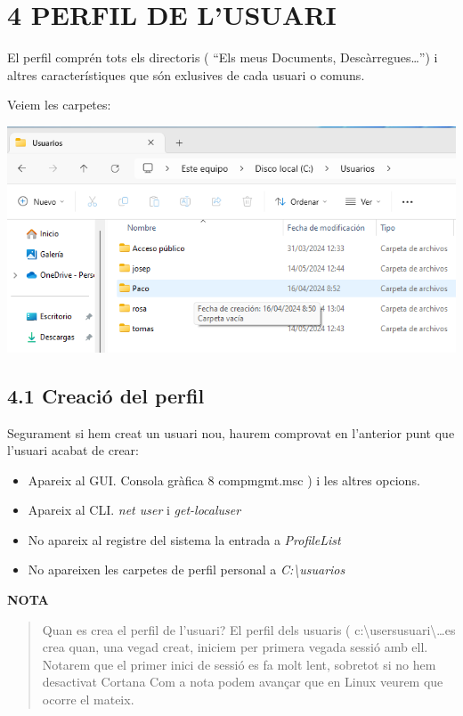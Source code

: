 \documentclass[
  a4paper,
]{article}
\providecommand{\tightlist}{%
  \setlength{\itemsep}{0pt}\setlength{\parskip}{0pt}}
\begin{document}
\section{4 PERFIL DE L'USUARI}\label{perfil-de-lusuari}

El perfil comprén tots els directoris ( ``Els meus Documents,
Descàrregues\ldots{}'') i altres característiques que són exlusives de
cada usuari o comuns.

Veiem les carpetes:

\includegraphics{png/users.png}

\subsection{4.1 Creació del perfil}\label{creaciuxf3-del-perfil}

Segurament si hem creat un usuari nou, haurem comprovat en l'anterior
punt que l'usuari acabat de crear:

\begin{itemize}
\tightlist
\item
  Apareix al GUI. Consola gràfica 8 compmgmt.msc ) i les altres opcions.
\item
  Apareix al CLI. \emph{net user} i \emph{get-localuser}
\item
  No apareix al registre del sistema la entrada a \emph{ProfileList}
\item
  No apareixen les carpetes de perfil personal a
  \emph{C:\textbackslash usuarios}
\end{itemize}

\textbf{NOTA}

\begin{quote}
Quan es crea el perfil de l'usuari? El perfil dels usuaris (
c:\textbackslash users\textbar usuari\textbackslash\ldots es crea quan,
una vegad creat, iniciem per primera vegada sessió amb ell. Notarem que
el primer inici de sessió es fa molt lent, sobretot si no hem desactivat
Cortana Com a nota podem avançar que en Linux veurem que ocorre el
mateix.
\end{quote}
\end{document}
